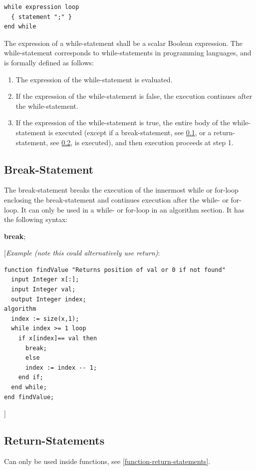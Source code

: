 \documentclass[10pt,a4paper]{report}
\def\doublelabel#1{\label{#1}\hypertarget{#1}{}}
\begin{document}
\begin{lstlisting}[language=grammar]
while expression loop
  { statement ";" }
end while
\end{lstlisting}
The expression of a while-statement shall be a scalar Boolean
expression. The while-statement corresponds to while-statements in
programming languages, and is formally defined as follows:
\begin{enumerate}
\item The expression of the while-statement is evaluated.
\item If the expression of the while-statement is false, the execution
continues after the while-statement.
\item If the expression of the while-statement is true, the entire body of
the while-statement is executed (except if a break-statement, see
\ref{break-statement}, or a return-statement, see \ref{return-statements}, is executed),
and then execution proceeds at step 1.
\end{enumerate}

\subsection{Break-Statement}\doublelabel{break-statement}

The break-statement breaks the execution of the innermost while or
for-loop enclosing the break-statement and continues execution after the
while- or for-loop. It can only be used in a while- or for-loop in an
algorithm section. It has the following syntax:

\textbf{break};

{[}\emph{Example (note this could alternatively use return)}:

\begin{lstlisting}[language=modelica]
function findValue "Returns position of val or 0 if not found"
  input Integer x[:];
  input Integer val;
  output Integer index;
algorithm
  index := size(x,1);
  while index >= 1 loop 
    if x[index]== val then
      break;
      else
      index := index -- 1;
    end if;
  end while;
end findValue;
\end{lstlisting}
{]}

\subsection{Return-Statements}\doublelabel{return-statements}

Can only be used inside functions, see \ref{function-return-statements}.
\end{document}
